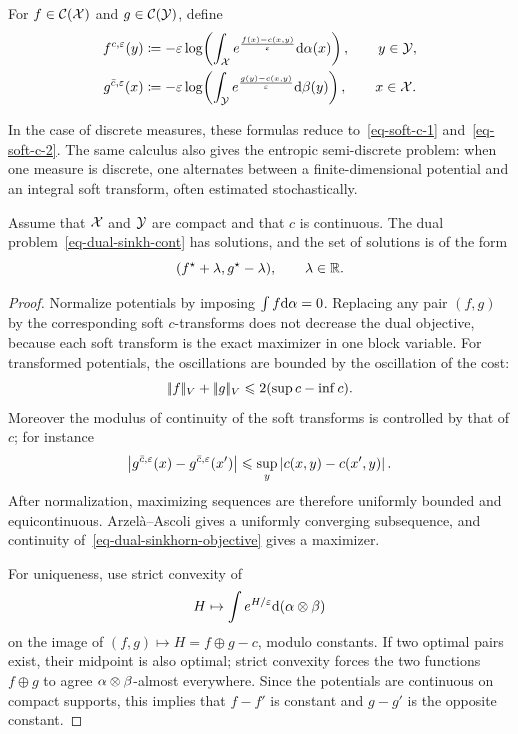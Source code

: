 \begin{defn}\label{def-continuous-soft-c-transform}
	For $f\in\mathcal{C}(\mathcal{X})$ and $g\in\mathcal{C}(\mathcal{Y})$, define
	\begin{align}
		f^{c,\varepsilon}(y)
		&\coloneqq
		-\varepsilon\log\!\left(
			\int_{\mathcal{X}}
			e^{\frac{f(x)-c(x,y)}{\varepsilon}}\mathrm{d}\alpha(x)
		\right),
		\qquad y\in\mathcal{Y}, \label{eq-soft-c-cont-f}\\
		g^{\bar c,\varepsilon}(x)
		&\coloneqq
		-\varepsilon\log\!\left(
			\int_{\mathcal{Y}}
			e^{\frac{g(y)-c(x,y)}{\varepsilon}}\mathrm{d}\beta(y)
		\right),
		\qquad x\in\mathcal{X} . \label{eq-soft-c-cont-g}
	\end{align}
\end{defn}
In the case of discrete measures, these formulas reduce to~\eqref{eq-soft-c-1} and~\eqref{eq-soft-c-2}. The same calculus also gives the entropic semi-discrete problem: when one measure is discrete, one alternates between a finite-dimensional potential and an integral soft transform, often estimated stochastically.

\begin{prop}\label{prop-entropic-dual-potentials}
	Assume that $\mathcal{X}$ and $\mathcal{Y}$ are compact and that $c$ is continuous. The dual problem~\eqref{eq-dual-sinkh-cont} has solutions, and the set of solutions is of the form
	\[
		(f^\star+\lambda,g^\star-\lambda),
		\qquad \lambda\in\mathbb{R} .
	\]
\end{prop}

\begin{proof}
	Normalize potentials by imposing $\int f\mathrm{d}\alpha=0$. Replacing any pair $(f,g)$ by the corresponding soft $c$-transforms does not decrease the dual objective, because each soft transform is the exact maximizer in one block variable. For transformed potentials, the oscillations are bounded by the oscillation of the cost:
	\[
		|\!| f |\!|_V+|\!| g |\!|_V
		\leqslant
		2(\sup c-\inf c).
	\]
	Moreover the modulus of continuity of the soft transforms is controlled by that of $c$; for instance
	\[
		\left\lvert g^{\bar c,\varepsilon}(x)-g^{\bar c,\varepsilon}(x')\right\rvert
		\leqslant
		\sup_y\left\lvert c(x,y)-c(x',y)\right\rvert.
	\]
	After normalization, maximizing sequences are therefore uniformly bounded and equicontinuous. Arzel\`a--Ascoli gives a uniformly converging subsequence, and continuity of~\eqref{eq-dual-sinkhorn-objective} gives a maximizer.

	For uniqueness, use strict convexity of
	\[
		H\mapsto \int e^{H/\varepsilon}\mathrm{d}(\alpha\otimes\beta)
	\]
	on the image of $(f,g)\mapsto H=f\oplus g-c$, modulo constants. If two optimal pairs exist, their midpoint is also optimal; strict convexity forces the two functions $f\oplus g$ to agree $\alpha\otimes\beta$-almost everywhere. Since the potentials are continuous on compact supports, this implies that $f-f'$ is constant and $g-g'$ is the opposite constant.
\end{proof}

